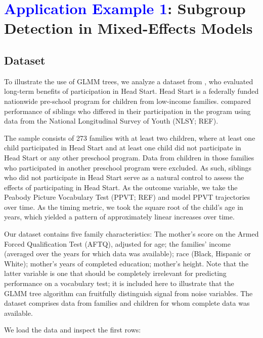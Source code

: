 \documentclass[doc,floatsintext,natbib]{apa7}
\newcommand{\edc}[1]{\textcolor{blue}{#1}}
\begin{document}
\newpage
\section{\edc{Application Example 1}: Subgroup Detection in Mixed-Effects Models}
\label{sec:TutorialMixed}



\subsection{Dataset}

To illustrate the use of GLMM trees, we analyze a dataset from \cite{Demi09}, who evaluated long-term benefits of participation in Head Start. Head Start is a federally funded nationwide  pre-school program for children from low-income families. \cite{Demi09} compared performance of siblings who differed in their participation in the program using data from the National Longitudinal Survey of Youth (NLSY; REF). 

The sample consists of 273 families with at least two children, where at least one child participated in Head Start and at least one child did not participate in Head Start or any other preschool program. Data from children in those families who participated in another preschool program were excluded. As such, siblings who did not participate in Head Start serve as a natural control to assess the effects of participating in Head Start. As the outcome variable, we take the Peabody Picture Vocabulary Test (PPVT; REF) and model PPVT trajectories over time. As the timing metric, we took the square root of the child's age in years, which yielded a pattern of approximately linear increases over time.

Our dataset contains five family characteristics: The mother's score on the Armed Forced Qualification Test (AFTQ), adjusted for age; the families' income (averaged over the years for which data was available); race (Black, Hispanic or White); mother's years of completed education; mother's height. Note that the latter variable is one that should be completely irrelevant for predicting performance on a vocabulary test; it is included here to illustrate that the GLMM tree algorithm can fruitfully distinguish signal from noise variables. The dataset comprises data from families and children for whom complete data was available. 

We load the data and inspect the first rows:
\end{document}
